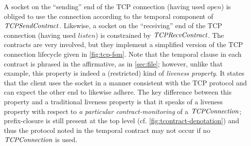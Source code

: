 A socket on the ``sending'' end of the TCP connection (having used $open$) is obliged to use the connection according to the temporal component of $\mathit{TCPSendContract}$.
%
Likewise, a socket on the ``receiving'' end of the TCP connection (having used $listen$) is constrained by $\mathit{TCPRecvContract}$.
%
The contracts are very involved, but they implement a simplified version of the TCP connection lifecycle given in \autoref{fig:tcp-fsm}.
%
Note that the temporal clause in each contract is phrased in the affirmative, as in \autoref{sec:file}; however, unlike that example, this property is indeed a (restricted) kind of \emph{liveness property}.
%
It states that the client uses the socket in a manner consistent with the TCP protocol and can expect the other end to likewise adhere.
%
The key difference between this property and a traditional liveness property is that it speaks of a liveness property with respect to \emph{a particular contract-monitoring} of a $\mathit{TCPConnection}$; prefix-closure is still present at the top level (cf. \autoref{fig:tcontract-denotation}) and thus the protocol noted in the temporal contract may not occur if no $\mathit{TCPConnection}$ is used.
